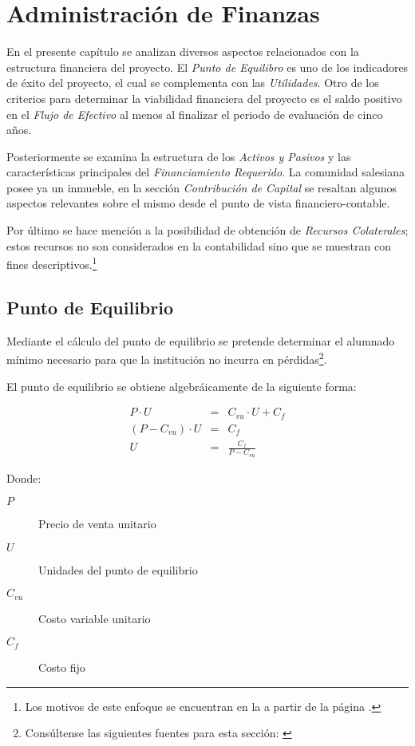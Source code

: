 \chapter{Administración de Finanzas}
\label{cap:Admin:Finanzas}

En el presente capítulo se analizan diversos aspectos relacionados con la estructura financiera del proyecto. El \emph{Punto de Equilibro} es uno de los indicadores de éxito del proyecto, el cual se complementa con las \emph{Utilidades}. Otro de los criterios para determinar la viabilidad financiera del proyecto es el saldo positivo en el \emph{Flujo de Efectivo} al menos al finalizar el periodo de evaluación de cinco años.

Posteriormente se examina la estructura de los \emph{Activos y Pasivos} y las características principales del \emph{Financiamiento Requerido}. La comunidad salesiana posee ya un inmueble, en la sección \emph{Contribución de Capital} se resaltan algunos aspectos relevantes sobre el mismo desde el punto de vista financiero-contable.

Por último se hace mención a la posibilidad de obtención de \emph{Recursos Colaterales}; estos recursos no son considerados en la contabilidad sino que se muestran con fines descriptivos.\footnote{Los motivos de este enfoque se encuentran en la  a partir de la página \pageref{ch:Introduccion}.}

\section{Punto de Equilibrio}

Mediante el cálculo del punto de equilibrio se pretende determinar el alumnado mínimo necesario para que la institución no incurra en pérdidas\footnote{Consúltense las siguientes fuentes para esta sección: \citep{Van2003fundamentos, novoa2008finanzas, bodie2003finanzas}}.

El punto de equilibrio se obtiene algebráicamente de la siguiente forma:

$$
	\begin{array}{rcl}
		P \cdot U &=& C_{vu} \cdot U + C_f \\
		\left( P - C_{vu} \right) \cdot U &=& C_f \\
		U &=& \frac{C_f}{P - C_{vu}}
	\end{array}
$$

Donde:

\begin{description}
	\item[$P$] Precio de venta unitario
	\item[$U$] Unidades del punto de equilibrio
	\item[$C_{vu}$] Costo variable unitario
	\item[$C_f$] Costo fijo
\end{description}


